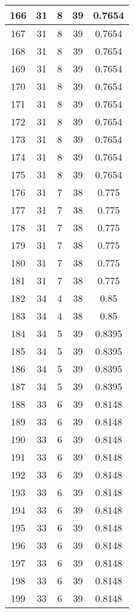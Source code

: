 \documentclass[letterpaper, 12pt]{article}
\begin{document}
\begin{longtable}{|c|c|c|c|c|}
\hline
166 & 31 & 8 & 39 & 0.7654 \\
\hline
167 & 31 & 8 & 39 & 0.7654 \\
\hline
168 & 31 & 8 & 39 & 0.7654 \\
\hline
169 & 31 & 8 & 39 & 0.7654 \\
\hline
170 & 31 & 8 & 39 & 0.7654 \\
\hline
171 & 31 & 8 & 39 & 0.7654 \\
\hline
172 & 31 & 8 & 39 & 0.7654 \\
\hline
173 & 31 & 8 & 39 & 0.7654 \\
\hline
174 & 31 & 8 & 39 & 0.7654 \\
\hline
175 & 31 & 8 & 39 & 0.7654 \\
\hline
176 & 31 & 7 & 38 & 0.775 \\
\hline
177 & 31 & 7 & 38 & 0.775 \\
\hline
178 & 31 & 7 & 38 & 0.775 \\
\hline
179 & 31 & 7 & 38 & 0.775 \\
\hline
180 & 31 & 7 & 38 & 0.775 \\
\hline
181 & 31 & 7 & 38 & 0.775 \\
\hline
182 & 34 & 4 & 38 & 0.85 \\
\hline
183 & 34 & 4 & 38 & 0.85 \\
\hline
184 & 34 & 5 & 39 & 0.8395 \\
\hline
185 & 34 & 5 & 39 & 0.8395 \\
\hline
186 & 34 & 5 & 39 & 0.8395 \\
\hline
187 & 34 & 5 & 39 & 0.8395 \\
\hline
188 & 33 & 6 & 39 & 0.8148 \\
\hline
189 & 33 & 6 & 39 & 0.8148 \\
\hline
190 & 33 & 6 & 39 & 0.8148 \\
\hline
191 & 33 & 6 & 39 & 0.8148 \\
\hline
192 & 33 & 6 & 39 & 0.8148 \\
\hline
193 & 33 & 6 & 39 & 0.8148 \\
\hline
194 & 33 & 6 & 39 & 0.8148 \\
\hline
195 & 33 & 6 & 39 & 0.8148 \\
\hline
196 & 33 & 6 & 39 & 0.8148 \\
\hline
197 & 33 & 6 & 39 & 0.8148 \\
\hline
198 & 33 & 6 & 39 & 0.8148 \\
\hline
199 & 33 & 6 & 39 & 0.8148 \\
\hline
\end{longtable}
\end{document}
